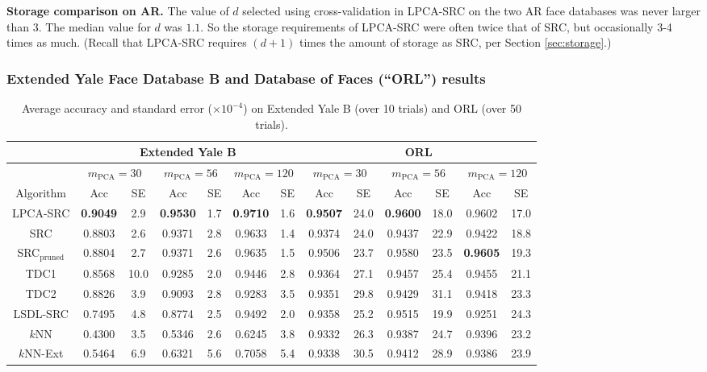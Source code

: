 \documentclass[review]{elsarticle}
\begin{document}
\textbf{Storage comparison on AR.} The value of $d$ selected using cross-validation in LPCA-SRC on the two AR face databases was never larger than 3. The median value for $d$ was $1.1$. So the storage requirements of LPCA-SRC were often twice that of SRC, but occasionally 3-4 times as much. (Recall that LPCA-SRC requires $(d+1)$ times the amount of storage as SRC, per Section \ref{sec:storage}.)


\subsubsection{Extended Yale Face Database B and Database of Faces (``ORL'') results} 
\label{sec:yale_orl}

\begin{table}[!htb] 
\small{
\centering
\begin{tabular}{|c|c|c|c|c|c|c|c|c|c|c|c|c|}
\hline
& \multicolumn{6}{|c|}{Extended Yale B} & \multicolumn{6}{|c|}{ORL} \\
\hline
& \multicolumn{2}{|c|}{$m_{\mathrm{PCA}} = 30$} & \multicolumn{2}{|c|}{$m_{\mathrm{PCA}} = 56$}  & \multicolumn{2}{|c|}{$m_{\mathrm{PCA}} = 120$}  & \multicolumn{2}{|c|}{$m_{\mathrm{PCA}} = 30$}  & \multicolumn{2}{|c|}{$m_{\mathrm{PCA}} = 56$} & \multicolumn{2}{|c|}{$m_{\mathrm{PCA}} = 120$}  \\
\hline
Algorithm & Acc & SE  & Acc & SE  &  Acc & SE  &  Acc & SE  &  Acc & SE &   Acc & SE   \\
\hline
LPCA-SRC & \textbf{0.9049}	&	2.9	&	\textbf{0.9530}	&	1.7	&	\textbf{0.9710}	&	1.6	&	\textbf{0.9507}	&	24.0	&	\textbf{0.9600}	&	18.0	&	0.9602	&	17.0 \\
SRC & 0.8803	&	2.6	&	0.9371	&	2.8	&	0.9633	&	1.4	&	0.9374	&	24.0	&	0.9437	&	22.9	&	0.9422	&	18.8 \\
SRC$_\text{pruned}$ & 0.8804	&	2.7	&	0.9371	&	2.6	&	0.9635	&	1.5	&	0.9506	&	23.7	&	0.9580	&	23.5	&	\textbf{0.9605}	&	19.3 \\
TDC1 &	0.8568	&	10.0	&	0.9285	&	2.0	&	0.9446	&	2.8 	&	0.9364	&	27.1	&	0.9457	&	25.4	&	0.9455	&	21.1	\\
TDC2 &	0.8826	&	3.9	&	0.9093	&	2.8	&	0.9283	&	3.5 	&	0.9351	&	29.8	&	0.9429	&	31.1	&	0.9418	&	23.3	\\
LSDL-SRC & 0.7495	&	4.8	&	0.8774	&	2.5	&	0.9492	&	2.0	&	0.9358	&	25.2	&	0.9515	&	19.9	&	0.9251	&	24.3	\\
$k$NN & 0.4300	& 3.5	& 0.5346	& 2.6	& 0.6245	& 3.8	& 0.9332	&	26.3	&	0.9387	&	24.7	&	0.9396	&	23.2 \\
$k$NN-Ext & 0.5464	& 6.9	& 0.6321	& 5.6	& 0.7058	& 5.4	& 0.9338	&	30.5	&	0.9412	&	28.9	&	0.9386	&	23.9\\
\hline
\end{tabular}
\caption{Average accuracy and standard error ($\times 10^{-4}$) on Extended Yale B (over 10 trials) and ORL (over 50 trials).} 
\label{Ext_Yale_B_ORL_res} }
\end{table}
\end{document}
